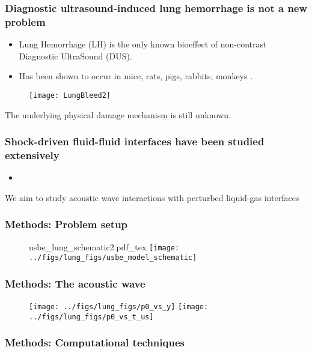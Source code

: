 \begin{frame} \frametitle{Diagnostic ultrasound-induced lung hemorrhage is not a new problem}
{\small
  \begin{itemize}
  \item Lung Hemorrhage (LH) is the only known bioeffect of non-contrast Diagnostic UltraSound (DUS).
  \item Has been shown to occur in mice, rats, pigs, rabbits, monkeys \citep{Child1990,OBrien1997a,OBrien2001,Tarantal1994a}.
  \end{itemize}
}
\vspace{-0.5cm}
  \begin{figure}
    \centering
    \texttt{[image: LungBleed2]} \nocite{Miller2012}
  \end{figure}
\vspace{-0.35cm}
The underlying physical damage mechanism is still unknown.
%
\end{frame}
\begin{frame} \frametitle{Shock-driven fluid-fluid interfaces have been studied extensively}
  \begin{itemize}
  \item 
  \end{itemize}
\end{frame}
\begin{frame}
We aim to study acoustic wave interactions with perturbed liquid-gas interfaces
\end{frame}
\begin{frame} \frametitle{Methods: Problem setup}
  \begin{figure}
    \centering
    \def\svgwidth{0.48\textwidth}
    {\footnotesize
    {usbe_lung_schematic2.pdf_tex} \hfill%
  }
    \texttt{[image: ../figs/lung\_figs/usbe\_model\_schematic]} \hfill
  \end{figure}
\end{frame}
\begin{frame} \frametitle{Methods: The acoustic wave}
  \begin{figure}
    \centering
      \texttt{[image: ../figs/lung\_figs/p0\_vs\_y]}%
      \texttt{[image: ../figs/lung\_figs/p0\_vs\_t\_us]}%
  \end{figure}
\end{frame}
\begin{frame} \frametitle{Methods: Computational techniques}
  \begin{figure}
    \centering
    
  \end{figure}
\end{frame}

